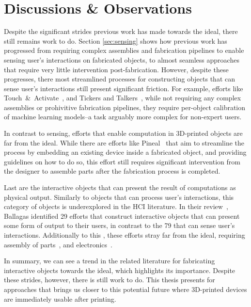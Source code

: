   \section{Discussions \& Observations}
    Despite the significant strides previous work has made towards the \papf
    ideal, there still remains work to do. Section \ref{sec:sensing} shows how
    previous work has progressed from requiring complex assemblies and
    fabrication pipelines to enable sensing user's interactions on fabricated
    objects, to almost seamless approaches that require very little intervention
    post-fabrication. However, despite these progresses, there most streamlined
    processes for constructing objects that can sense user's interactions still
    present significant friction. For example, efforts like
    Touch~\&~Activate~\cite{}, and Tickers and Talkers~\cite{}, while not
    requiring any complex assemblies or prohivitive fabrication pipelines, they
    require per-object calibration of machine learning models--a task arguably
    more complex for non-expert users. 

    In contrast to sensing, efforts that enable computation in 3D-printed
    objects are far from the \papf ideal. While there are efforts like
    Pineal~\cite{Ledo:2017} that aim to streamline the process by embedding an
    existing device inside a fabricated object, and providing guidelines on how
    to do so, this effort still requires significant intervention from the
    designer to assemble parts after the fabrication process is completed.

    Last are the interactive objects that can present the result of computations
    as physical output. Similarly to objects that can process user's
    interactions, this category of objects is underexplored in the HCI
    literature. In their review~\cite{Ballagas:2018}, Ballagas \etal identified
    29 efforts that construct interactive objects that can present some form of
    output to their users, in contrast to the 79 that can sense user's
    interactions.  Additionally to this , these efforts
    stray far from the \papf ideal, requiring assembly of parts~\cite{}, and
    electronics~\cite{}.

    In summary, we can see a trend in the related literature for fabricating
    interactive objects towards the \papf ideal, which highlights its
    importance. Despite these strides, however, there is still work to do. This
    thesis presents for approaches that brings us closer to this potential
    future where 3D-printed devices are immediately usable after printing.